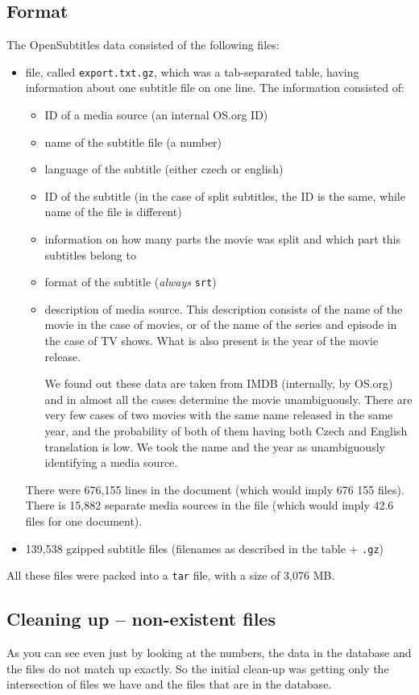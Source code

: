 \subsection*{Format}
The OpenSubtitles data consisted of the following files:
\begin{itemize}
    \item file, called \texttt{export.txt.gz}, which was a tab-separated table, having information about one subtitle file on one line. The information consisted of:
    \begin{itemize}
        \item ID of a media source (an internal OS.org ID)
        \item name of the subtitle file (a number)
        \item language of the subtitle (either czech or english)
        \item ID of the subtitle (in the case of split subtitles, the ID is the same, while name of the file is different)
        \item information on how many parts the movie was split and which part this subtitles belong to
        \item format of the subtitle (\emph{always} \texttt{srt})
        \item description of media source. This description consists of the name of the movie in the case of movies, or of the name of the series and episode in the case of TV shows. What is also present is the year of the movie release.
        
         We found out these data are taken from IMDB (internally, by OS.org) and in almost all the cases determine the movie unambiguously. There are very few cases of two movies with the same name released in the same year, and the probability of both of them having both Czech and English translation is low. We took the name and the year as unambiguously identifying a media source.
    \end{itemize}
    
    There were 676,155 lines in the document (which would imply 676 155 files). There is 15,882 separate media sources in the file (which would imply 42.6 files for one document).
    \item 139,538 gzipped subtitle files (filenames as described in the table + \texttt{.gz})
\end{itemize}
All these files were packed into a \texttt{tar} file, with a size of 3,076 MB.

\subsection*{Cleaning up -- non-existent files}
As you can see even just by looking at the numbers, the data in the database and the files do not match up exactly. So the initial clean-up was getting only the intersection of files we have and the files that are in the database. 

